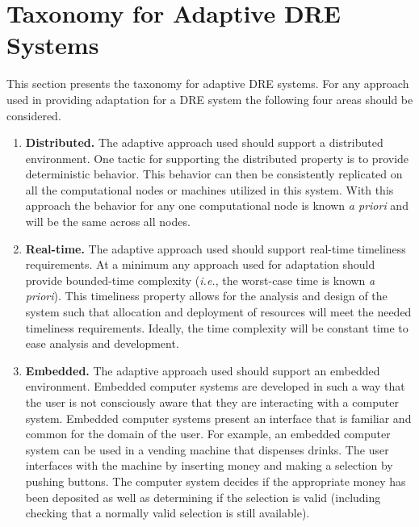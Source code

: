 \documentclass[conference]{IEEEtran}
\begin{document}
\section{Taxonomy for Adaptive DRE Systems}
\label{taxonomy}
This section presents the taxonomy for adaptive DRE systems. For any approach used in providing adaptation for a DRE system the following four areas should be considered.
\begin{enumerate}
\item \textbf{Distributed.} The adaptive approach used should support a distributed environment. One tactic for supporting the distributed property is to provide deterministic behavior. This behavior can then be consistently replicated on all the computational nodes or machines utilized in this system. With this approach the behavior for any one computational node is known \emph{a priori} and will be the same across all nodes.

\item \textbf{Real-time.} The adaptive approach used should support real-time timeliness requirements. At a minimum any approach used for adaptation should provide bounded-time complexity (\emph{i.e.}, the worst-case time is known \emph{a priori}). This timeliness property allows for the analysis and design of the system such that allocation and deployment of resources will meet the needed timeliness requirements. Ideally, the time complexity will be constant time to ease analysis and development.

\item \textbf{Embedded.} The adaptive approach used should support an embedded environment. Embedded computer systems are developed in such a way that the user is not consciously aware that they are interacting with a computer system. Embedded computer systems present an interface that is familiar and common for the domain of the user. For example, an embedded computer system can be used in a vending machine that dispenses drinks. The user interfaces with the machine by inserting money and making a selection by pushing buttons. The computer system decides if the appropriate money has been deposited as well as determining if the selection is valid (including checking that a normally valid selection is still available).


\end{enumerate}
\end{document}
